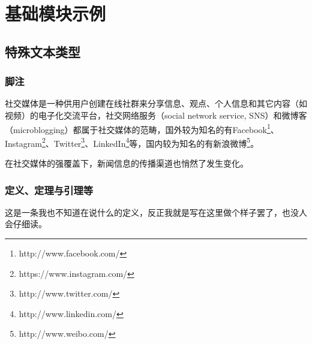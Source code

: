 \documentclass[a4paper,AutoFakeBold,oneside,12pt]{book}
\begin{document}
\blankmatter
  

\blankmatter
  

\blankmatter
  

\blankmatter
 

\frontmatter\tableofcontents %


\newpage\mainmatter
{}


\chapter{基础模块示例}

\section{特殊文本类型}
\subsection{脚注}
社交媒体是一种供用户创建在线社群来分享信息、观点、个人信息和其它内容（如视频）的电子化交流平台，社交网络服务（social network service, SNS）和微博客（microblogging）都属于社交媒体的范畴\cite{webster_social_media}，国外较为知名的有Facebook\footnote{http://www.facebook.com/}、Instagram\footnote{https://www.instagram.com/}、Twitter\footnote{http://www.twitter.com/}、LinkedIn\footnote{http://www.linkedin.com/}等，国内较为知名的有新浪微博\footnote{http://www.weibo.com/}。

在社交媒体的强覆盖下，新闻信息的传播渠道也悄然了发生变化。\cite{false_news_spread_2018}

\subsection{定义、定理与引理等}
\begin{definition}
这是一条我也不知道在说什么的定义，反正我就是写在这里做个样子罢了，也没人会仔细读。\cite{周兴2017基于深度学习的谣言检测及模式挖掘}
\end{definition}
\end{document}
